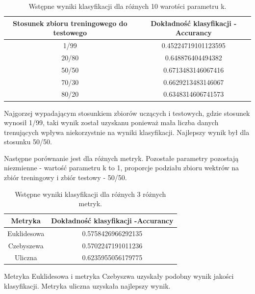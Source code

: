 \documentclass{classrep}
\begin{document}
\begin{table}[h!]
 \caption{Wstępne wyniki klasyfikacji dla różnych 10 warotści parametru k.}
 \centering
 \vspace{0.1cm}
 \begin{tabular}{c c}
  \textbf{Stosunek zbioru treningowego do testowego} & \textbf{Dokładność klasyfikacji -Accurancy}\\
\hline
  1/99 & 0.45224719101123595\\
  20/80 &  0.648876404494382\\
  50/50 &  0.6713483146067416\\
  70/30 &  0.6629213483146067\\
  80/20 &  0.6348314606741573\\
 \end{tabular}
 \label{wyniki klasyfikacji dla roznych 10 wartosci parametru k}
\end{table}

Najgorzej wypadającym stosunkiem zbiorów uczących i testowych, gdzie stosunek wynosił 1/99, taki wynik został uzyskanu ponieważ mała liczba danych trenujących wpływa niekorzystnie na wyniki klasyfikacji. Najlepszy wynik był dla stosunku 50/50. 

Następne porównanie jest dla różnych metryk. Pozostałe parametry pozostają niezmienne - wartość parametru k to 1, proporcje podziału zbioru wektrów na zbiór treningowy i zbiór testowy - 50/50. 

\begin{table}[h!]
 \caption{Wstępne wyniki klasyfikacji dla różnych 3 różnych metryk.}
 \centering
 \vspace{0.1cm}
 \begin{tabular}{c c}
  \textbf{Metryka} & \textbf{Dokładność klasyfikacji -Accurancy}\\
\hline
  Euklidesowa &0.5758426966292135\\
  Czebyszewa & 0.5702247191011236\\
  Uliczna & 0.6235955056179775\\
 \end{tabular}
 \label{wyniki klasyfikacji dla roznych 10 wartosci parametru k}
\end{table}

Metryka Euklidesowa i metryka Czebyszwa uzyskały podobny wynik jakości klasyfikacji. Metryka uliczna uzyskała najlepszy wynik. 
\end{document}

